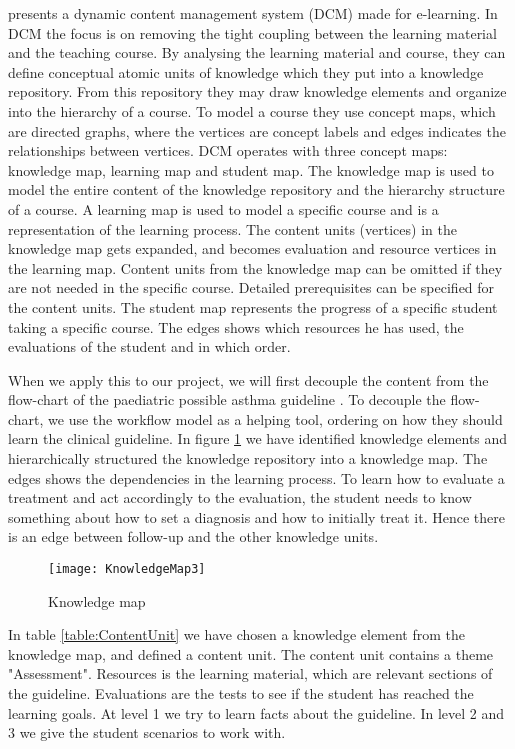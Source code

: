 \textcite{Eide2008} presents a dynamic content management system (DCM) made for e-learning. In DCM the focus is on removing the tight coupling between the learning material and the teaching course. By analysing the learning material and course, they can define conceptual atomic units of knowledge which they put into a knowledge repository. From this repository they may draw knowledge elements and organize into the hierarchy of a course. To model a course they use concept maps, which are directed graphs, where the vertices are concept labels and edges indicates the relationships between vertices. DCM operates with three concept maps: knowledge map, learning map and student map. The knowledge map is used to model the entire content of the knowledge repository and the hierarchy structure of a course. A learning map is used to model a specific course and is a representation of the learning process. The content units (vertices) in the knowledge map gets expanded, and becomes evaluation and resource vertices in the learning map. Content units from the knowledge map can be omitted if they are not needed in the specific course. Detailed prerequisites can be specified for the content units. The student map represents the progress of a specific student taking a specific course. The edges shows which resources he has used, the evaluations of the student and in which order. 


When we apply this to our project, we will first decouple the content from the flow-chart of the paediatric possible asthma guideline \parencite{RepublicofKeny2016}. To decouple the flow-chart, we use the workflow model as a helping tool, ordering on how they should learn the clinical guideline. In figure \ref{fig:KnowledgeMap} we have identified knowledge elements and hierarchically structured the knowledge repository into a knowledge map. The edges shows the dependencies in the learning process. To learn how to evaluate a treatment and act accordingly to the evaluation, the student needs to know something about how to set a diagnosis and how to initially treat it. Hence there is an edge between follow-up and the other knowledge units.

\begin{figure}[h!]
	\texttt{[image: KnowledgeMap3]}
	\caption {Knowledge map}
	\label{fig:KnowledgeMap}
\end{figure}

In table \ref{table:ContentUnit} we have chosen a knowledge element from the knowledge map, and defined a content unit. The content unit contains a theme "Assessment". Resources is the learning material, which are relevant sections of the guideline. Evaluations are the tests to see if the student has reached the learning goals. At level 1 we try to learn facts about the guideline. In level 2 and 3 we give the student scenarios to work with.

